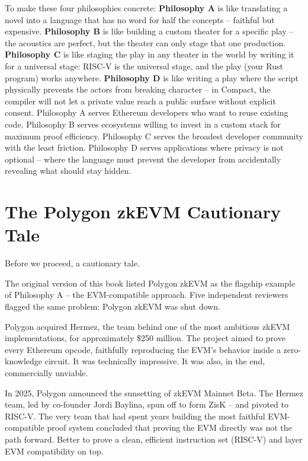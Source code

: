 \documentclass[
  11pt,
  openany]{report}
\renewcommand{\textbf}[1]{{\bfseries\color{MidnightBold}#1}}
\begin{document}
To make these four philosophies concrete: \textbf{Philosophy A} is like
translating a novel into a language that has no word for half the concepts --
faithful but expensive. \textbf{Philosophy B} is like building a custom theater
for a specific play -- the acoustics are perfect, but the theater can only stage
that one production. \textbf{Philosophy C} is like staging the play in any
theater in the world by writing it for a universal stage: RISC-V is the
universal stage, and the play (your Rust program) works anywhere.
\textbf{Philosophy D} is like writing a play where the script physically
prevents the actors from breaking character -- in Compact, the compiler will not
let a private value reach a public surface without explicit consent. Philosophy
A serves Ethereum developers who want to reuse existing code. Philosophy B
serves ecosystems willing to invest in a custom stack for maximum proof
efficiency. Philosophy C serves the broadest developer community with the least
friction. Philosophy D serves applications where privacy is not optional --
where the language must prevent the developer from accidentally revealing what
should stay hidden.

\section{The Polygon zkEVM Cautionary
Tale}\label{the-polygon-zkevm-cautionary-tale}

Before we proceed, a cautionary tale.

The original version of this book listed Polygon zkEVM as the flagship example
of Philosophy A -- the EVM-compatible approach. Five independent reviewers
flagged the same problem: Polygon zkEVM was shut down.

Polygon acquired Hermez, the team behind one of the most ambitious zkEVM
implementations, for approximately \$250 million. The project aimed to prove
every Ethereum opcode, faithfully reproducing the EVM's behavior inside a
zero-knowledge circuit. It was technically impressive. It was also, in the end,
commercially unviable.

In 2025, Polygon announced the sunsetting of zkEVM Mainnet Beta. The Hermez
team, led by co-founder Jordi Baylina, spun off to form ZisK -- and pivoted to
RISC-V. The very team that had spent years building the most faithful
EVM-compatible proof system concluded that proving the EVM directly was not the
path forward. Better to prove a clean, efficient instruction set (RISC-V) and
layer EVM compatibility on top.
\end{document}
